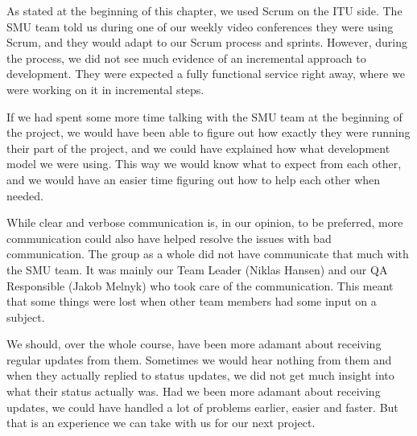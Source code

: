 As stated at the beginning of this chapter, we used Scrum on the ITU side. The SMU team told us during one of our weekly video conferences they were using Scrum, and they would adapt to our Scrum process and sprints. However, during the process, we did not see much evidence of an incremental approach to development. They were expected a fully functional service right away, where we were working on it in incremental steps.

If we had spent some more time talking with the SMU team at the beginning of the project, we would have been able to figure out how exactly they were running their part of the project, and we could have explained how what development model we were using. This way we would know what to expect from each other, and we would have an easier time figuring out how to help each other when needed.

While clear and verbose communication is, in our opinion, to be preferred, more communication could also have helped resolve the issues with bad communication. The group as a whole did not have communicate that much with the SMU team. It was mainly our Team Leader (Niklas Hansen) and our QA Responsible (Jakob Melnyk) who took care of the communication. This meant that some things were lost when other team members had some input on a subject.

We should, over the whole course, have been more adamant about receiving regular updates from them. Sometimes we would hear nothing from them and when they actually replied to status updates, we did not get much insight into what their status actually was. Had we been more adamant about receiving updates, we could have handled a lot of problems earlier, easier and faster. But that is an experience we can take with us for our next project.